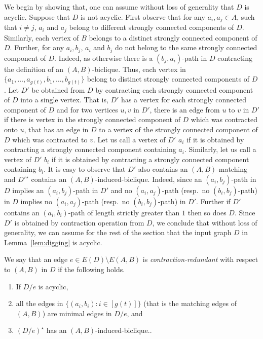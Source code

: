 \documentclass[a4paper,11pt]{article}
\theoremstyle{plain}
\newtheorem{identification rule}{Identification Rule}
\theoremstyle{definition}
\theoremstyle{remark}
\begin{document}
We begin by showing that, one can assume without loss of generality that $D$ is acyclic.
Suppose that $D$ is not acyclic. First observe that for any $a_i,a_j \in A$, such that $i \neq j$, $a_i$ and $a_j$ belong to different strongly connected components of $D$. Similarly, each vertex of $B$ belongs to a distinct strongly connected component of $D$. Further, for any $a_i,b_j$, $a_i$ and $b_j$ do not belong to the same strongly connected component of $D$. Indeed, as otherwise there is a $(b_j,a_i)$-path in $D$ contracting the definition of an $(A,B)$-biclique. Thus, each vertex in $\{a_1, \ldots, a_{g(t)}, b_1 , \ldots, b_{g(t)}\}$ belong to distinct strongly connected components of $D$.
Let $D'$ be obtained from $D$ by contracting each strongly connected component of $D$ into a single vertex. That is, $D'$ has a vertex for each strongly connected component of $D$ and for two vertices $u,v$ in $D'$, there is an edge from $u$ to $v$ in $D'$ if there is vertex in the strongly connected component of $D$ which was contracted onto $u$, that has an edge in $D$ to a vertex of the strongly connected component of $D$ which was contracted to $v$. Let us call a vertex of $D'$ $a_i$ if it is obtained by contracting a strongly connected component containing $a_i$. Similarly, let us call a vertex of $D'$ $b_i$ if it is obtained by contracting a strongly connected component containing $b_i$. It is easy to observe that $D'$ also contains an $(A,B)$-matching and $D'^{\star}$ contains an $(A,B)$-induced-biclique. Indeed, since an $(a_i,b_j)$-path in $D$ implies an $(a_i,b_j)$-path in $D'$ and no $(a_i,a_j)$-path (resp.~no $(b_i,b_j)$-path) in $D$ implies no $(a_i,a_j)$-path (resp.~no $(b_i,b_j)$-path) in $D'$. Further if $D'$ contains an $(a_i,b_i)$-path of length strictly greater than $1$ then so does $D$. Since $D'$ is obtained by contraction operation from $D$, we conclude that without loss of generality, we can assume for the rest of the section that the input graph $D$ in Lemma~\ref{lem:digging} is acyclic.

We say that an edge $e \in E(D) \setminus E(A,B)$ is {\em contraction-redundant} with respect to $(A,B)$ in $D$ if the following holds.

\begin{enumerate}
\item If $D/e$ is acyclic, 
\item all the edges in $\{(a_i,b_i) : i \in [g(t)]\}$ (that is the matching edges of $(A,B)$) are minimal edges in $D/e$, and
\item $(D/e)^{\star}$ has an $(A,B)$-induced-biclique..
\end{enumerate} 
\end{document}
